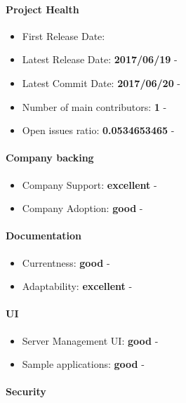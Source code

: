 \documentclass{article}
\begin{document}
\paragraph{Project Health}

\begin{itemize}
\item First Release Date: 
\item Latest Release Date: \textbf{2017/06/19} - 
\item Latest Commit Date: \textbf{2017/06/20} - 
\item Number of main contributors: \textbf{1} - 
\item Open issues ratio: \textbf{0.0534653465} - 
\end{itemize}

\paragraph{Company backing}

\begin{itemize}
\item Company Support: \textbf{excellent} - 
\item Company Adoption: \textbf{good} - 
\end{itemize}

\paragraph{Documentation}

\begin{itemize}
\item Currentness: \textbf{good} - 
\item Adaptability: \textbf{excellent} - 
\end{itemize}

\paragraph{UI}

\begin{itemize}
\item Server Management UI: \textbf{good} - 
\item Sample applications: \textbf{good} - 
\end{itemize}

\paragraph{Security} 
\end{document}
